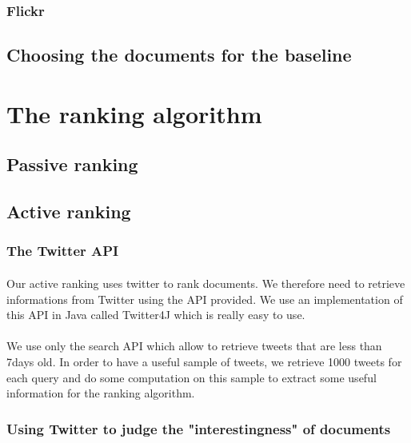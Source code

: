 \documentclass[10pt, a4paper]{article}
\begin{document}
\subsubsection{Flickr}

\subsection{Choosing the documents for the baseline}



\section{The ranking algorithm}


\subsection{Passive ranking}


\subsection{Active ranking}

\subsubsection{The Twitter API}
\paragraph{}Our active ranking uses twitter to rank documents. We therefore need to retrieve informations from Twitter using the API provided. We use an implementation of this API in Java called Twitter4J which is really easy to use.

\paragraph{}We use only the search API which allow to retrieve tweets that are less than 7days old. In order to have a useful sample of tweets, we retrieve 1000 tweets for each query and do some computation on this sample to extract some useful information for the ranking algorithm.

\subsubsection{Using Twitter to judge the "interestingness" of documents}
\end{document}
